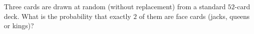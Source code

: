 Three cards are drawn at random (without replacement) from a standard $52$-card deck. What is the probability that exactly $2$ of them are face cards (jacks, queens or kings)?
